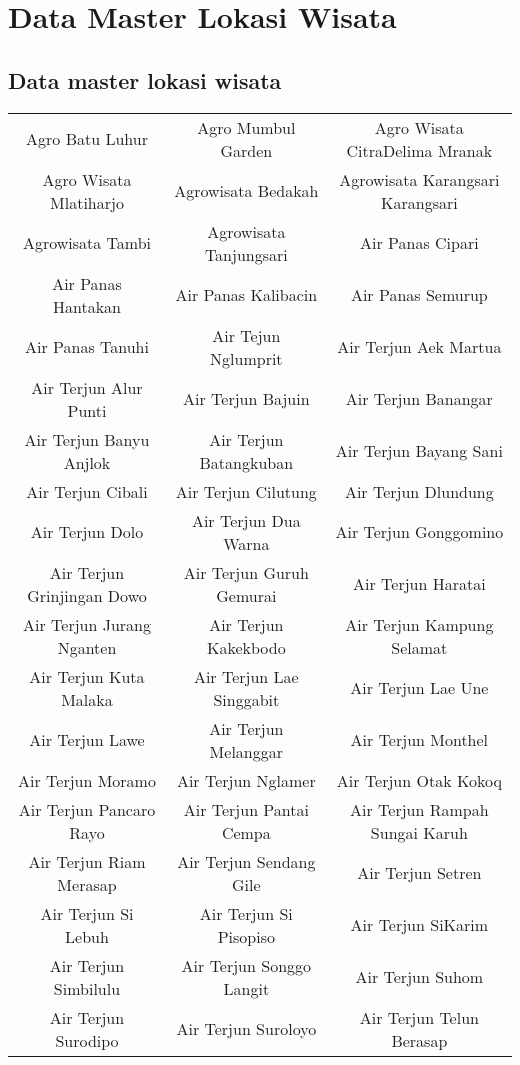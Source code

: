 \chapter{Data Master Lokasi Wisata}
\label{app:A}

\section{Data master lokasi wisata}
\begin{table}[H]
	\centering
	\tiny
	\begin{tabular}{ c | c | c }
Agro Batu Luhur & Agro Mumbul Garden & Agro Wisata CitraDelima Mranak\\
Agro Wisata Mlatiharjo & Agrowisata Bedakah & Agrowisata Karangsari Karangsari\\
Agrowisata Tambi & Agrowisata Tanjungsari & Air Panas Cipari\\
Air Panas Hantakan & Air Panas Kalibacin & Air Panas Semurup\\
Air Panas Tanuhi & Air Tejun Nglumprit & Air Terjun Aek Martua\\
Air Terjun Alur Punti & Air Terjun Bajuin & Air Terjun Banangar\\
Air Terjun Banyu Anjlok & Air Terjun Batangkuban & Air Terjun Bayang Sani\\
Air Terjun Cibali & Air Terjun Cilutung & Air Terjun Dlundung\\
Air Terjun Dolo & Air Terjun Dua Warna & Air Terjun Gonggomino\\
Air Terjun Grinjingan Dowo & Air Terjun Guruh Gemurai & Air Terjun Haratai\\
Air Terjun Jurang Nganten & Air Terjun Kakekbodo & Air Terjun Kampung Selamat\\
Air Terjun Kuta Malaka & Air Terjun Lae Singgabit & Air Terjun Lae Une\\
Air Terjun Lawe & Air Terjun Melanggar & Air Terjun Monthel\\
Air Terjun Moramo & Air Terjun Nglamer & Air Terjun Otak Kokoq\\
Air Terjun Pancaro Rayo & Air Terjun Pantai Cempa & Air Terjun Rampah Sungai Karuh\\
Air Terjun Riam Merasap & Air Terjun Sendang Gile & Air Terjun Setren\\
Air Terjun Si Lebuh & Air Terjun Si Pisopiso & Air Terjun SiKarim\\
Air Terjun Simbilulu & Air Terjun Songgo Langit & Air Terjun Suhom\\
Air Terjun Surodipo & Air Terjun Suroloyo & Air Terjun Telun Berasap\\

\end{tabular}
\end{table}
